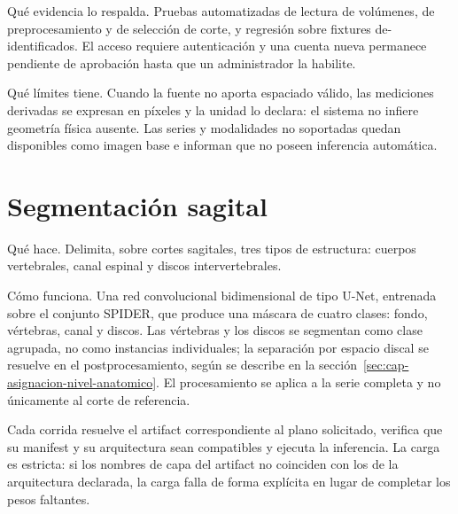 Qué evidencia lo respalda. Pruebas automatizadas de lectura de volúmenes, de preprocesamiento y de selección de corte, y regresión sobre fixtures de-identificados. El acceso requiere autenticación y una cuenta nueva permanece pendiente de aprobación hasta que un administrador la habilite.

Qué límites tiene. Cuando la fuente no aporta espaciado válido, las mediciones derivadas se expresan en píxeles y la unidad lo declara: el sistema no infiere geometría física ausente. Las series y modalidades no soportadas quedan disponibles como imagen base e informan que no poseen inferencia automática.

\section{Segmentación sagital}

Qué hace. Delimita, sobre cortes sagitales, tres tipos de estructura: cuerpos vertebrales, canal espinal y discos intervertebrales.

Cómo funciona. Una red convolucional bidimensional de tipo U-Net, entrenada sobre el conjunto SPIDER, que produce una máscara de cuatro clases: fondo, vértebras, canal y discos. Las vértebras y los discos se segmentan como clase agrupada, no como instancias individuales; la separación por espacio discal se resuelve en el postprocesamiento, según se describe en la sección~\ref{sec:cap-asignacion-nivel-anatomico}. El procesamiento se aplica a la serie completa y no únicamente al corte de referencia.

Cada corrida resuelve el artifact correspondiente al plano solicitado, verifica que su manifest y su arquitectura sean compatibles y ejecuta la inferencia. La carga es estricta: si los nombres de capa del artifact no coinciden con los de la arquitectura declarada, la carga falla de forma explícita en lugar de completar los pesos faltantes.


